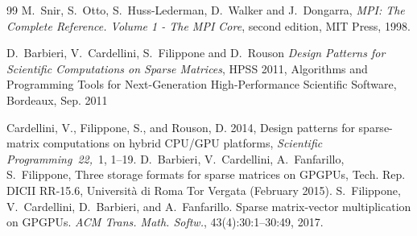 \begin{thebibliography}{99}
M.~Snir, S.~Otto, S.~Huss-Lederman, D.~Walker and J.~Dongarra,
{\em MPI: The Complete Reference. Volume 1 - The MPI Core}, second edition,
MIT Press, 1998.
%

 D.~Barbieri, V.~Cardellini, S.~Filippone and D.~Rouson
{\em Design Patterns for Scientific Computations on Sparse Matrices},
 HPSS 2011, Algorithms and Programming Tools for Next-Generation High-Performance Scientific Software, Bordeaux, Sep. 2011
  
{ Cardellini, V.}, { Filippone, S.}, { and} { Rouson, D.} 2014,
 Design patterns for sparse-matrix computations on hybrid {CPU/GPU}
  platforms,
{\em Scientific Programming\/}~{\em 22,\/}~1, 1--19.
D.~Barbieri, V.~Cardellini, A.~Fanfarillo, S.~Filippone, Three storage formats
  for sparse matrices on {GPGPUs}, Tech. Rep. DICII RR-15.6,
  Universit\`a di
  Roma Tor Vergata (February 2015).
S.~Filippone, V.~Cardellini, D.~Barbieri, and A.~Fanfarillo.
 Sparse matrix-vector multiplication on {GPGPUs}.
 {\em ACM Trans. Math. Softw.}, 43(4):30:1--30:49, 2017.

  

\end{thebibliography}
